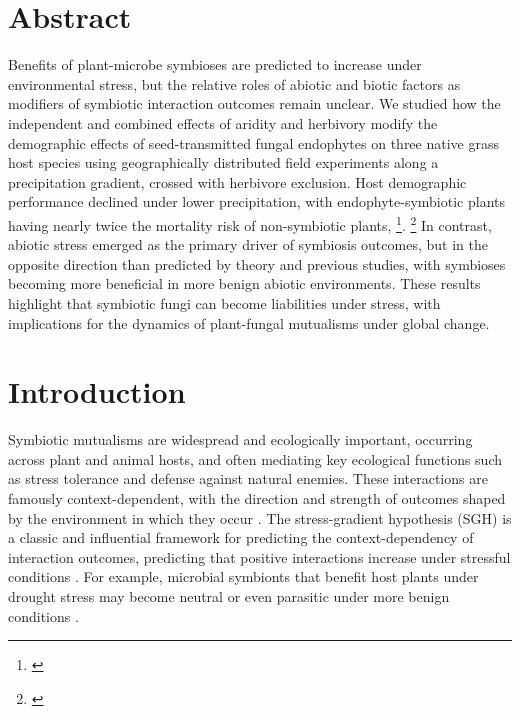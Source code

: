 \documentclass[12pt]{article}\usepackage[]{graphicx}\usepackage[dvipsnames]{xcolor}
\newcommand{\tom}[2]{{\color{red}{#1}}\footnote{\textit{\color{red}{#2}}}}
\begin{document}
\section*{Abstract}
Benefits of plant-microbe symbioses are predicted to increase under environmental stress, but the relative roles of abiotic and biotic factors as modifiers of symbiotic interaction outcomes remain unclear.
We studied how the independent and combined effects of aridity and herbivory modify the demographic effects of seed-transmitted fungal endophytes on three native grass host species using geographically distributed field experiments along a precipitation gradient, crossed with herbivore exclusion. 
Host demographic performance declined under lower precipitation, with endophyte-symbiotic plants having nearly twice the mortality risk of non-symbiotic plants, \tom{and spikelet production was frequently reduced under such stressful conditions}{Unclear whether this is a statement about symbiont effects, or abiotic effects, or both.}.
\tom{Herbivory had only occasional effects on plant–microbe symbioses.}{Can you add a little more detail to this statement? It's pretty vague.} 
In contrast, abiotic stress emerged as the primary driver of symbiosis outcomes, but in the opposite direction than predicted by theory and previous studies, with symbioses becoming more beneficial in more benign abiotic environments.
These results highlight that symbiotic fungi can become liabilities under stress, with implications for the dynamics of plant-fungal mutualisms under global change.

\newpage
\section*{Introduction}
Symbiotic mutualisms are widespread and ecologically important, occurring across plant and animal hosts, and often mediating key ecological functions such as stress tolerance and defense against natural enemies. 
These interactions are famously context-dependent, with the direction and strength of outcomes shaped by the environment in which they occur \citep{hoeksema2015context, bronstein1994conditional,hoang2024impacts}. 
The stress-gradient hypothesis (SGH) is a classic and influential framework for predicting the context-dependency of interaction outcomes, predicting that positive interactions increase under stressful conditions \citep{louthan2015and,bertness1994positive,holmgren2010strong}.
For example, microbial symbionts that benefit host plants under drought stress may become neutral or even parasitic under more benign conditions \citep{giauque2019endophyte}. 
\end{document}
